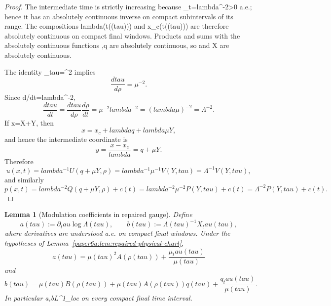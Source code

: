 \documentclass[11pt]{amsart}
\def\({}%
\def\){}%
\def\tau{tau}%
\def\lambda{lambda}%
\theoremstyle{plain}
\newtheorem{lemma}[lemma]{Lemma}
\theoremstyle{definition}
\theoremstyle{remark}
\begin{document}
\begin{proof}
The intermediate time \(\rho\) is strictly increasing because
\(\rho_t=\lambda^{-2}>0\) a.e.; hence it has an absolutely continuous inverse
on compact subintervals of its range.  The compositions
\(\lambda(t(\rho(\tau)))\) and \(x_c(t(\rho(\tau)))\) are therefore
absolutely continuous on compact final windows.  Products and sums with the
absolutely continuous functions \(\mu,q\) are absolutely continuous, so
\(\Lambda\) and \(X\) are absolutely continuous.

The identity \(\rho_\tau=\mu^2\) implies
\[
  \frac{d\tau}{d\rho}=\mu^{-2}.
\]
Since \(d\rho/dt=\lambda^{-2}\),
\[
  \frac{d\tau}{dt}
  =
  \frac{d\tau}{d\rho}\frac{d\rho}{dt}
  =
  \mu^{-2}\lambda^{-2}
  =
  (\lambda\mu)^{-2}
  =
  \Lambda^{-2}.
\]
If \(x=X+\Lambda Y\), then
\[
  x=x_c+\lambda q+\lambda\mu Y,
\]
and hence the intermediate coordinate is
\[
  y=\frac{x-x_c}{\lambda}=q+\mu Y.
\]
Therefore
\[
  u(x,t)
  =
  \lambda^{-1}U(q+\mu Y,\rho)
  =
  \lambda^{-1}\mu^{-1}V(Y,\tau)
  =
  \Lambda^{-1}V(Y,\tau),
\]
and similarly
\[
  p(x,t)
  =
  \lambda^{-2}Q(q+\mu Y,\rho)+c(t)
  =
  \lambda^{-2}\mu^{-2}P(Y,\tau)+c(t)
  =
  \Lambda^{-2}P(Y,\tau)+c(t).
\]
\end{proof}

\begin{lemma}[Modulation coefficients in repaired gauge]
\label{paper6a:lem:repaired-modulation-coefficients}
Define
\[
  a(\tau):=\partial_\tau\log\Lambda(\tau),
  \qquad
  b(\tau):=\Lambda(\tau)^{-1}X_\tau(\tau),
\]
where derivatives are understood a.e. on compact final windows.  Under the
hypotheses of Lemma~\ref{paper6a:lem:repaired-physical-chart},
\[
  a(\tau)=\mu(\tau)^2A(\rho(\tau))+\frac{\mu_\tau(\tau)}{\mu(\tau)}
\]
and
\[
  b(\tau)=\mu(\tau)B(\rho(\tau))
  +\mu(\tau)A(\rho(\tau))q(\tau)
  +\frac{q_\tau(\tau)}{\mu(\tau)}.
\]
In particular \(a,b\in L^1_{\rm loc}\) on every compact final time interval.
\end{lemma}
\end{document}
